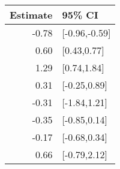 \begin{tabular}{rl}
  \hline
Estimate & 95\% CI \\ 
  \hline
-0.78 & [-0.96,-0.59] \\ 
  0.60 & [0.43,0.77] \\ 
  1.29 & [0.74,1.84] \\ 
  0.31 & [-0.25,0.89] \\ 
  -0.31 & [-1.84,1.21] \\ 
  -0.35 & [-0.85,0.14] \\ 
  -0.17 & [-0.68,0.34] \\ 
  0.66 & [-0.79,2.12] \\ 
   \hline
\end{tabular}

